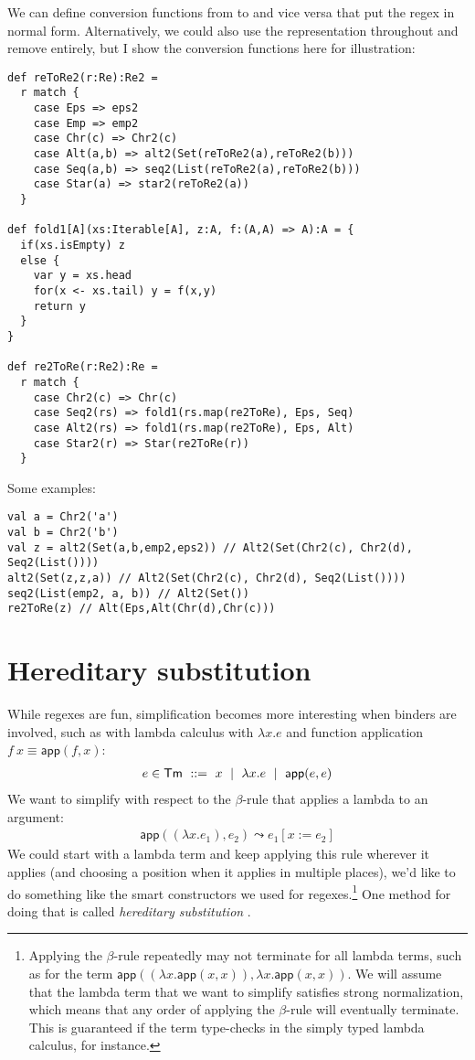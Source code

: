 We can define conversion functions from  to  and vice versa that put the regex in normal form.
Alternatively, we could also use the  representation throughout and remove  entirely, but I show the conversion functions here for illustration:

\begin{lstlisting}
def reToRe2(r:Re):Re2 =
  r match {
    case Eps => eps2
    case Emp => emp2
    case Chr(c) => Chr2(c)
    case Alt(a,b) => alt2(Set(reToRe2(a),reToRe2(b)))
    case Seq(a,b) => seq2(List(reToRe2(a),reToRe2(b)))
    case Star(a) => star2(reToRe2(a))
  }

def fold1[A](xs:Iterable[A], z:A, f:(A,A) => A):A = {
  if(xs.isEmpty) z
  else {
    var y = xs.head
    for(x <- xs.tail) y = f(x,y)
    return y
  }
}

def re2ToRe(r:Re2):Re =
  r match {
    case Chr2(c) => Chr(c)
    case Seq2(rs) => fold1(rs.map(re2ToRe), Eps, Seq)
    case Alt2(rs) => fold1(rs.map(re2ToRe), Eps, Alt)
    case Star2(r) => Star(re2ToRe(r))
  }
\end{lstlisting}

Some examples:

\begin{lstlisting}
val a = Chr2('a')
val b = Chr2('b')
val z = alt2(Set(a,b,emp2,eps2)) // Alt2(Set(Chr2(c), Chr2(d), Seq2(List())))
alt2(Set(z,z,a)) // Alt2(Set(Chr2(c), Chr2(d), Seq2(List())))
seq2(List(emp2, a, b)) // Alt2(Set())
re2ToRe(z) // Alt(Eps,Alt(Chr(d),Chr(c)))
\end{lstlisting}


\section{Hereditary substitution}

\newcommand{\ap}{\mathsf{app}}
\newcommand{\steps}{\leadsto}

While regexes are fun, simplification becomes more interesting when binders are involved, such as with lambda calculus with $\lambda x. e$ and function application $f\ x \equiv \ap(f,x)$:
\begin{align*}
  e \in \mathsf{Tm} \ ::=\  x \md \lambda x. e \md \ap(e,e)
\end{align*}
We want to simplify with respect to the $\beta$-rule that applies a lambda to an argument:
\begin{align*}
  \ap((\lambda x. e_1), e_2) \steps e_1[x := e_2]
\end{align*}
We could start with a lambda term and keep applying this rule wherever it applies (and choosing a position when it applies in multiple places), we'd like to do something like the smart constructors we used for regexes.\footnote{Applying the $\beta$-rule repeatedly may not terminate for all lambda terms, such as for the term $\ap((\lambda x. \ap(x,x)), \lambda x. \ap(x,x))$. We will assume that the lambda term that we want to simplify satisfies strong normalization, which means that any order of applying the $\beta$-rule will eventually terminate. This is guaranteed if the term type-checks in the simply typed lambda calculus, for instance.}
One method for doing that is called \emph{hereditary substitution} \cite{keller:inria-00520606}.

